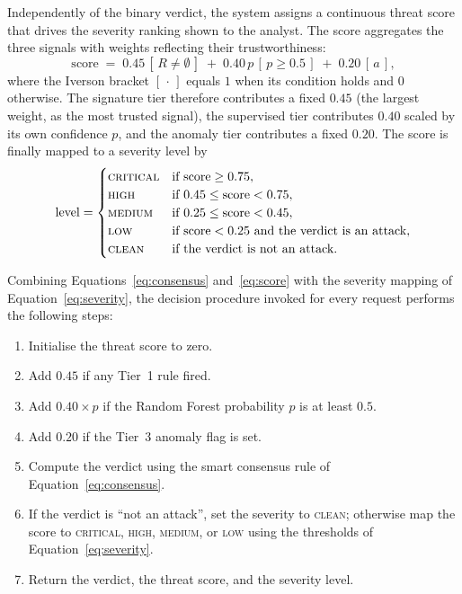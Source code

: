 \documentclass[../main.tex]{subfiles}
\begin{document}
Independently of the binary verdict, the system assigns a continuous threat
score that drives the severity ranking shown to the analyst. The score
aggregates the three signals with weights reflecting their trustworthiness:
\begin{equation}
  \mathrm{score} \;=\; 0.45\,[\,R \neq \emptyset\,] \;+\;
  0.40\,p\,[\,p \geq 0.5\,] \;+\; 0.20\,[\,a\,],
  \label{eq:score}
\end{equation}
where the Iverson bracket $[\,\cdot\,]$ equals $1$ when its condition holds
and $0$ otherwise. The signature tier therefore contributes a fixed $0.45$
(the largest weight, as the most trusted signal), the supervised tier
contributes $0.40$ scaled by its own confidence $p$, and the anomaly tier
contributes a fixed $0.20$. The score is finally mapped to a severity level
by
\begin{equation}
  \mathrm{level} =
  \begin{cases}
    \textsc{critical} & \text{if } \mathrm{score} \geq 0.75,\\
    \textsc{high}     & \text{if } 0.45 \leq \mathrm{score} < 0.75,\\
    \textsc{medium}   & \text{if } 0.25 \leq \mathrm{score} < 0.45,\\
    \textsc{low}      & \text{if } \mathrm{score} < 0.25 \text{ and the verdict is an attack},\\
    \textsc{clean}    & \text{if the verdict is not an attack.}
  \end{cases}
  \label{eq:severity}
\end{equation}

Combining Equations~\eqref{eq:consensus} and~\eqref{eq:score} with the
severity mapping of Equation~\eqref{eq:severity}, the decision procedure
invoked for every request performs the following steps:

\begin{enumerate}[leftmargin=1.8em, itemsep=2pt]
  \item Initialise the threat score to zero.
  \item Add $0.45$ if any Tier~1 rule fired.
  \item Add $0.40 \times p$ if the Random Forest probability $p$ is at least
        $0.5$.
  \item Add $0.20$ if the Tier~3 anomaly flag is set.
  \item Compute the verdict using the smart consensus rule of
        Equation~\eqref{eq:consensus}.
  \item If the verdict is ``not an attack'', set the severity to
        \textsc{clean}; otherwise map the score to \textsc{critical},
        \textsc{high}, \textsc{medium}, or \textsc{low} using the thresholds
        of Equation~\eqref{eq:severity}.
  \item Return the verdict, the threat score, and the severity level.
\end{enumerate}
\end{document}
